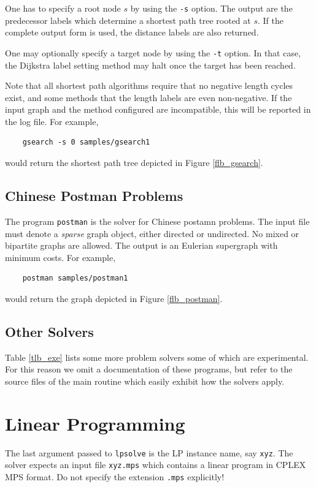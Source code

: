 \documentclass[a4paper,11pt,twoside]{book}
\begin{document}
\begin{multicols}{2}
One has to specify a root node $s$ by using the \verb/-s/ option. The output
are the predecessor labels which determine a shortest path tree rooted at $s$.
If the complete output form is used, the distance labels are also returned.

One may optionally specify a target node by using the \verb/-t/ option. In that
case, the Dijkstra label setting method may halt once the target has been
reached.

Note that all shortest path algorithms require that no negative length cycles
exist, and some methods that the length labels are even non-negative. If the
input graph and the method configured are incompatible, this will be reported
in the log file. For example,
\begin{verbatim}
    gsearch -s 0 samples/gsearch1
\end{verbatim}
would return the shortest path tree depicted in Figure \ref{flb_gsearch}.


\subsection{Chinese Postman Problems}
The program \verb/postman/ is the solver for Chinese postamn problems. The input
file must denote a {\it sparse} graph object, either directed or undirected. No
mixed or bipartite graphs are allowed. The output is an Eulerian supergraph
with minimum costs. For example,
\begin{verbatim}
    postman samples/postman1
\end{verbatim}
would return the graph depicted in Figure \ref{flb_postman}.


\subsection{Other Solvers}
Table \ref{tlb_exe} lists some more problem solvers some of which are
experimental. For this reason we omit a documentation of these programs, but
refer to the source files of the main routine which easily exhibit how
the solvers apply.



\section{Linear Programming}
The last argument passed to \verb/lpsolve/ is the LP instance name, say
\verb/xyz/. The solver expects an input file \verb/xyz.mps/ which contains
a linear program in CPLEX MPS format. Do not specify the extension \verb/.mps/
explicitly!


\end{multicols}
\end{document}

